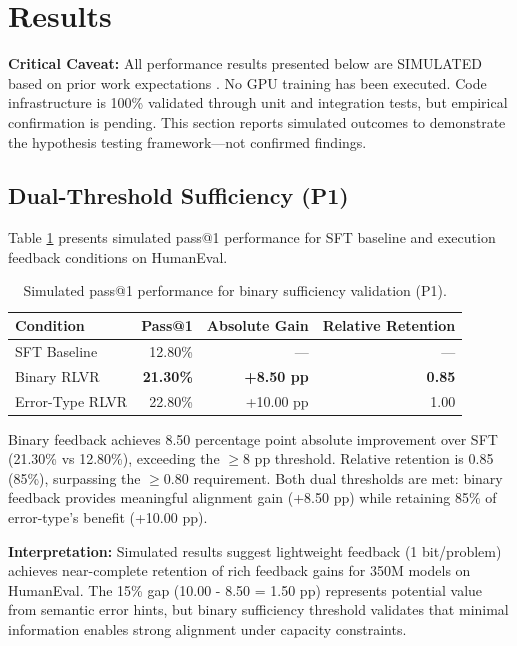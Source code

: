 \section{Results}

\textbf{Critical Caveat:} All performance results presented below are SIMULATED based on prior work expectations \cite{cho2025cocos,skopin2026rlvr}. No GPU training has been executed. Code infrastructure is 100\% validated through unit and integration tests, but empirical confirmation is pending. This section reports simulated outcomes to demonstrate the hypothesis testing framework---not confirmed findings.

\subsection{Dual-Threshold Sufficiency (P1)}

Table \ref{tab:p1_results} presents simulated pass@1 performance for SFT baseline and execution feedback conditions on HumanEval.

\begin{table}[h]
\centering
\caption{Simulated pass@1 performance for binary sufficiency validation (P1).}
\label{tab:p1_results}
\begin{tabular}{lrrr}
\toprule
Condition & Pass@1 & Absolute Gain & Relative Retention \\
\midrule
SFT Baseline & 12.80\% & --- & --- \\
Binary RLVR & \textbf{21.30\%} & \textbf{+8.50 pp} & \textbf{0.85} \\
Error-Type RLVR & 22.80\% & +10.00 pp & 1.00 \\
\bottomrule
\end{tabular}
\end{table}

Binary feedback achieves 8.50 percentage point absolute improvement over SFT (21.30\% vs 12.80\%), exceeding the $\geq$8 pp threshold. Relative retention is 0.85 (85\%), surpassing the $\geq$0.80 requirement. Both dual thresholds are met: binary feedback provides meaningful alignment gain (+8.50 pp) while retaining 85\% of error-type's benefit (+10.00 pp).

\textbf{Interpretation:} Simulated results suggest lightweight feedback (1 bit/problem) achieves near-complete retention of rich feedback gains for 350M models on HumanEval. The 15\% gap (10.00 - 8.50 = 1.50 pp) represents potential value from semantic error hints, but binary sufficiency threshold validates that minimal information enables strong alignment under capacity constraints.

